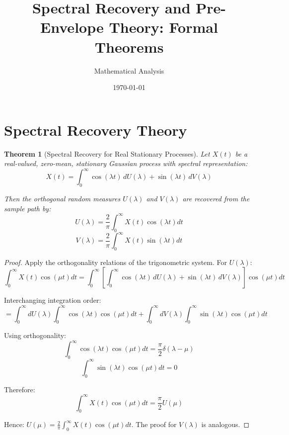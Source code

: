 \documentclass[11pt]{article}
\title{Spectral Recovery and Pre-Envelope Theory: Formal Theorems}
\author{Mathematical Analysis}
\date{\today}
\newtheorem{theorem}{Theorem}[section]
\begin{document}
\maketitle

\section{Spectral Recovery Theory}

\begin{theorem}[Spectral Recovery for Real Stationary Processes]
\label{thm:spectral_recovery}
Let $X(t)$ be a real-valued, zero-mean, stationary Gaussian process with spectral representation:
\begin{equation}
\label{eq:spectral_rep_real}
X(t) = \int_0^{\infty} \cos(\lambda t) \, dU(\lambda) + \sin(\lambda t) \, dV(\lambda)
\end{equation}

Then the orthogonal random measures $U(\lambda)$ and $V(\lambda)$ are recovered from the sample path by:
\begin{equation}
\label{eq:u_recovery}
U(\lambda) = \frac{2}{\pi} \int_0^{\infty} X(t) \cos(\lambda t) dt
\end{equation}
\begin{equation}
\label{eq:v_recovery}
V(\lambda) = \frac{2}{\pi} \int_0^{\infty} X(t) \sin(\lambda t) dt
\end{equation}
\end{theorem}

\begin{proof}
Apply the orthogonality relations of the trigonometric system. For $U(\lambda)$:
\begin{equation}
\label{eq:u_proof_step1}
\int_0^{\infty} X(t) \cos(\mu t) dt = \int_0^{\infty} \left[\int_0^{\infty} \cos(\lambda t) \, dU(\lambda) + \sin(\lambda t) \, dV(\lambda)\right] \cos(\mu t) dt
\end{equation}

Interchanging integration order:
\begin{equation}
\label{eq:u_proof_step2}
= \int_0^{\infty} dU(\lambda) \int_0^{\infty} \cos(\lambda t) \cos(\mu t) dt + \int_0^{\infty} dV(\lambda) \int_0^{\infty} \sin(\lambda t) \cos(\mu t) dt
\end{equation}

Using orthogonality:
\begin{equation}
\label{eq:orthogonality_cos}
\int_0^{\infty} \cos(\lambda t) \cos(\mu t) dt = \frac{\pi}{2} \delta(\lambda - \mu)
\end{equation}
\begin{equation}
\label{eq:orthogonality_sin_cos}
\int_0^{\infty} \sin(\lambda t) \cos(\mu t) dt = 0
\end{equation}

Therefore:
\begin{equation}
\label{eq:u_proof_final}
\int_0^{\infty} X(t) \cos(\mu t) dt = \frac{\pi}{2} U(\mu)
\end{equation}

Hence: $U(\mu) = \frac{2}{\pi} \int_0^{\infty} X(t) \cos(\mu t) dt$. The proof for $V(\lambda)$ is analogous.
\end{proof}
\end{document}
